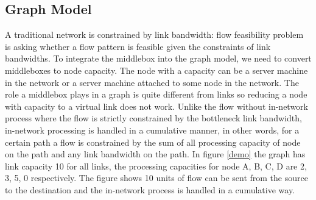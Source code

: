 \documentclass[twocolumn]{article}
\begin{document}
\subsection{Graph Model}\label{graphmodel}
A traditional network is constrained by link bandwidth: flow feasibility problem is asking whether a flow pattern is feasible given the constraints of link bandwidths. To integrate the middlebox into the graph model, we need to convert middleboxes to node capacity. The node with a capacity can be a server machine in the network or a server machine attached to some node in the network. The role a middlebox plays in a graph is quite different from links so reducing a node with capacity to a virtual link does not work. Unlike the flow without in-network process where the flow is strictly constrained by the bottleneck link bandwidth, in-network processing is handled in a cumulative manner, in other words, for a certain path a flow is constrained by the sum of all processing capacity of node on the path and any link bandwidth on the path. In figure \ref{demo} the graph has link capacity 10 for all links, the processing capacities for node A, B, C, D are 2, 3, 5, 0 respectively. The figure shows 10 units of flow can be sent from the source to the destination and the in-network process is handled in a cumulative way.
\end{document}
